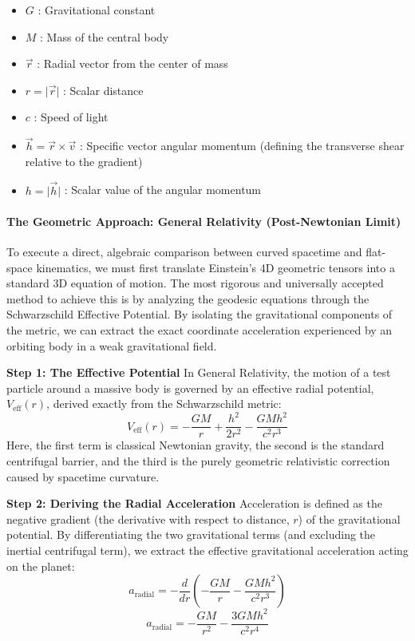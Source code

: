 \documentclass[twocolumn]{article}
\providecommand{\tightlist}{%
  \setlength{\itemsep}{0pt}\setlength{\parskip}{0pt}}
\begin{document}
\begin{itemize}
\tightlist
\item
  \(G\) : Gravitational constant
\item
  \(M\) : Mass of the central body
\item
  \(\vec{r}\) : Radial vector from the center of mass
\item
  \(r = \lvert \vec{r} \rvert\) : Scalar distance
\item
  \(c\) : Speed of light
\item
  \(\vec{h} = \vec{r} \times \vec{v}\) : Specific vector angular
  momentum (defining the transverse shear relative to the gradient)
\item
  \(h = \lvert \vec{h} \rvert\) : Scalar value of the angular momentum
\end{itemize}

\paragraph{The Geometric Approach: General Relativity (Post-Newtonian
Limit)}\label{the-geometric-approach-general-relativity-post-newtonian-limit}

To execute a direct, algebraic comparison between curved spacetime and
flat-space kinematics, we must first translate Einstein's 4D geometric
tensors into a standard 3D equation of motion. The most rigorous and
universally accepted method to achieve this is by analyzing the geodesic
equations through the Schwarzschild Effective Potential. By isolating
the gravitational components of the metric, we can extract the exact
coordinate acceleration experienced by an orbiting body in a weak
gravitational field.

\textbf{Step 1: The Effective Potential} In General Relativity, the
motion of a test particle around a massive body is governed by an
effective radial potential, \(V_{\text{eff}}(r)\), derived exactly from
the Schwarzschild metric:
\[V_{\text{eff}}(r) = -\frac{GM}{r} + \frac{h^2}{2r^2} - \frac{GMh^2}{c^2r^3}\]
Here, the first term is classical Newtonian gravity, the second is the
standard centrifugal barrier, and the third is the purely geometric
relativistic correction caused by spacetime curvature.

\textbf{Step 2: Deriving the Radial Acceleration} Acceleration is
defined as the negative gradient (the derivative with respect to
distance, \(r\)) of the gravitational potential. By differentiating the
two gravitational terms (and excluding the inertial centrifugal term),
we extract the effective gravitational acceleration acting on the
planet:
\[a_{\text{radial}} = -\frac{d}{dr} \left( -\frac{GM}{r} - \frac{GMh^2}{c^2r^3} \right)\]
\[a_{\text{radial}} = -\frac{GM}{r^2} - \frac{3GMh^2}{c^2r^4}\]
\end{document}
